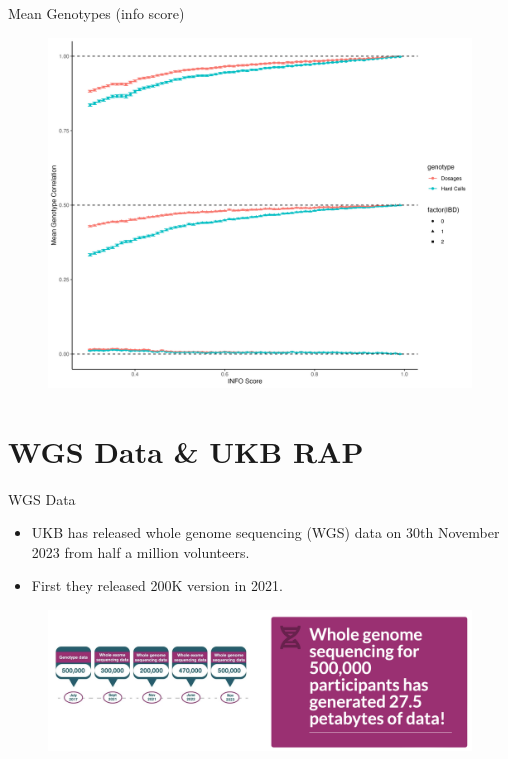 \documentclass{beamer}
\begin{document}
\begin{frame}{Mean Genotypes (info score)}

\begin{figure}

      \includegraphics[width= .85\textwidth]{fig/mean_gt_by_ibd.png}
      
\end{figure}

\end{frame}



\section{WGS Data \& UKB RAP}


\begin{frame}{WGS Data}

\begin{itemize}
      \item UKB has released whole genome sequencing (WGS) data
       on 30th November 2023 from half a million volunteers.
       \item First they released 200K version in 2021.
\end{itemize}

\begin{figure}
      \includegraphics[width = \textwidth]{fig/sc1.png}
\end{figure}
      




\end{frame}
\end{document}
